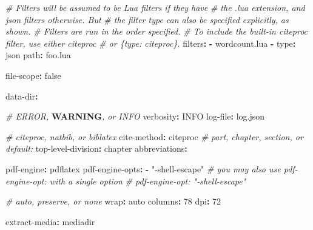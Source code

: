 \documentclass[]{article}
\newenvironment{Shaded}{}{}
\newcommand{\AlertTok}[1]{\textcolor[rgb]{1.00,0.00,0.00}{\textbf{#1}}}
\newcommand{\AttributeTok}[1]{\textcolor[rgb]{0.49,0.56,0.16}{#1}}
\newcommand{\CharTok}[1]{\textcolor[rgb]{0.25,0.44,0.63}{#1}}
\newcommand{\CommentTok}[1]{\textcolor[rgb]{0.38,0.63,0.69}{\textit{#1}}}
\newcommand{\DecValTok}[1]{\textcolor[rgb]{0.25,0.63,0.44}{#1}}
\newcommand{\FunctionTok}[1]{\textcolor[rgb]{0.02,0.16,0.49}{#1}}
\newcommand{\KeywordTok}[1]{\textcolor[rgb]{0.00,0.44,0.13}{\textbf{#1}}}
\newcommand{\StringTok}[1]{\textcolor[rgb]{0.25,0.44,0.63}{#1}}
\begin{document}
\begin{Shaded}
\begin{Highlighting}[]
\CommentTok{\# Filters will be assumed to be Lua filters if they have}
\CommentTok{\# the .lua extension, and json filters otherwise.  But}
\CommentTok{\# the filter type can also be specified explicitly, as shown.}
\CommentTok{\# Filters are run in the order specified.}
\CommentTok{\# To include the built{-}in citeproc filter, use either \textasciigrave{}citeproc\textasciigrave{}}
\CommentTok{\# or \textasciigrave{}\{type: citeproc\}\textasciigrave{}.}
\FunctionTok{filters}\KeywordTok{:}
\KeywordTok{{-}}\AttributeTok{ wordcount.lua}
\KeywordTok{{-}}\AttributeTok{ }\FunctionTok{type}\KeywordTok{:}\AttributeTok{ json}
\AttributeTok{  }\FunctionTok{path}\KeywordTok{:}\AttributeTok{ foo.lua}

\FunctionTok{file{-}scope}\KeywordTok{:}\AttributeTok{ }\CharTok{false}

\FunctionTok{data{-}dir}\KeywordTok{:}

\CommentTok{\# ERROR, }\AlertTok{WARNING}\CommentTok{, or INFO}
\FunctionTok{verbosity}\KeywordTok{:}\AttributeTok{ INFO}
\FunctionTok{log{-}file}\KeywordTok{:}\AttributeTok{ log.json}

\CommentTok{\# citeproc, natbib, or biblatex}
\FunctionTok{cite{-}method}\KeywordTok{:}\AttributeTok{ citeproc}
\CommentTok{\# part, chapter, section, or default:}
\FunctionTok{top{-}level{-}division}\KeywordTok{:}\AttributeTok{ chapter}
\FunctionTok{abbreviations}\KeywordTok{:}

\FunctionTok{pdf{-}engine}\KeywordTok{:}\AttributeTok{ pdflatex}
\FunctionTok{pdf{-}engine{-}opts}\KeywordTok{:}
\KeywordTok{{-}}\AttributeTok{ }\StringTok{"{-}shell{-}escape"}
\CommentTok{\# you may also use pdf{-}engine{-}opt: with a single option}
\CommentTok{\# pdf{-}engine{-}opt: "{-}shell{-}escape"}

\CommentTok{\# auto, preserve, or none}
\FunctionTok{wrap}\KeywordTok{:}\AttributeTok{ auto}
\FunctionTok{columns}\KeywordTok{:}\AttributeTok{ }\DecValTok{78}
\FunctionTok{dpi}\KeywordTok{:}\AttributeTok{ }\DecValTok{72}

\FunctionTok{extract{-}media}\KeywordTok{:}\AttributeTok{ mediadir}


\end{Highlighting}
\end{Shaded}
\end{document}
